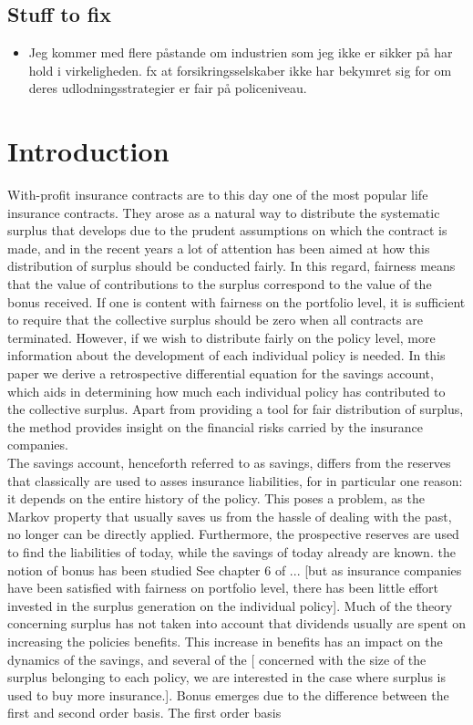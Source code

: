 \documentclass[12pt]{article}
\begin{document}
\subsection*{Stuff to fix}
\begin{itemize}
\item Jeg kommer med flere påstande om industrien som jeg ikke er sikker på har hold i virkeligheden. fx at forsikringsselskaber ikke har bekymret sig for om deres udlodningsstrategier er fair på policeniveau.
\end{itemize}
\section*{Introduction}

With-profit insurance contracts are to this day one of the most popular life insurance contracts. They arose as a natural way to distribute the systematic surplus that develops due to the prudent assumptions on which the contract is made, and in the recent years a lot of attention has been aimed at how this distribution of surplus should be conducted fairly. In this regard, fairness means that the value of contributions to the surplus correspond to the value of the bonus received. If one is content with fairness on the portfolio level, it is sufficient to require that the collective surplus should be zero when all contracts are terminated. However, if we wish to distribute fairly on the policy level, more information about the development of each individual policy is needed. In this paper we derive a retrospective differential equation for the savings account, which aids in determining how much each individual policy has contributed to the collective surplus. Apart from providing a tool for fair distribution of surplus, the method provides insight on the financial risks carried by the insurance companies.\\
The savings account, henceforth referred to as savings, differs from the reserves that classically are used to asses insurance liabilities, for in particular one reason: it depends on the entire history of the policy. This poses a problem, as the Markov property that usually saves us from the hassle of dealing with the past, no longer can be directly applied. Furthermore, the prospective reserves are used to find the liabilities of today, while the savings of today already are known. the notion of bonus has been studied See chapter 6 of \citet{Liv2}... [but as insurance companies have been satisfied with fairness on portfolio level, there has been little effort invested in the surplus generation on the individual policy]. Much of the theory concerning surplus has not taken into account that dividends usually are spent on increasing the policies benefits. This increase in benefits has an impact on the dynamics of the savings, and several of the  [\citep{NorbergB} concerned with the size of the surplus belonging to each policy, we are interested in the case where surplus is used to buy more insurance.]. Bonus emerges due to the difference between the first and second order basis. The first order basis
\end{document}
